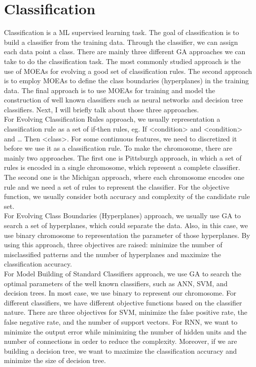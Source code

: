 \documentclass{article}
\begin{document}
\section{Classification}
Classification is a ML supervised learning task. The goal of classification is to build a classifier from the training data. Through the classifier, we can assign each data point a class. There are mainly three different GA approaches we can take to do the classification task. The most commonly studied approach is the use of MOEAs for evolving a good set of classification rules. The second approach is to employ MOEAs to define the class boundaries (hyperplanes) in the training data. The final approach is to use MOEAs for training and model the construction of well known classifiers such as neural networks and decision tree classifiers. Next, I will briefly talk about those three approaches. \cite{survey1} \\

For Evolving Classification Rules approach, we usually representation a classification rule as a set of if-then rules, eg. If <condition> and <condition> and … Then <class>. For some continuous features, we need to discretized it before we use it as a classification rule. To make the chromosome, there are mainly two approaches. The first one is Pittsburgh approach, in which a set of rules is encoded in a single chromosome, which represent a complete classifier. The second one is the Michigan approach, where each chromosome encodes one rule and we need a set of rules to represent the classifier. For the objective function, we usually consider both accuracy and complexity of the candidate rule set.\\

For Evolving Class Boundaries (Hyperplanes) approach, we usually use GA to search a set of hyperplanes, which could separate the data. Also, in this case, we use binary chromosome to representation the parameter of those hyperplanes. By using this approach, three objectives are raised: minimize the number of misclassified patterns and the number of hyperplanes and maximize the classification accuracy.\\

For  Model Building of Standard Classifiers approach, we use GA to search the optimal parameters of the well known classifiers, such as ANN, SVM, and decision trees. In most case, we use binary to represent our chromosome. For different classifiers, we have different objective functions based on the classifier nature. There are three objectives for SVM, minimize the false positive rate, the false negative rate, and the number of support vectors. For RNN, we want to minimize the output error while minimizing the number of hidden units and the number of connections in order to reduce the complexity. Moreover, if we are building a decision tree, we want to maximize the classification accuracy and minimize the size of decision tree.
\end{document}
